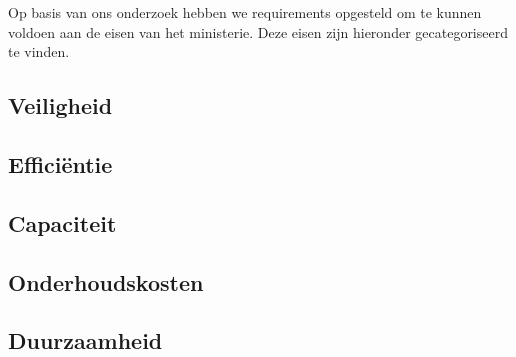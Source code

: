 \documentclass[../verslag.tex]{subfiles}
\begin{document}
Op basis van ons onderzoek hebben we requirements opgesteld om te kunnen voldoen aan de eisen van het ministerie. Deze eisen zijn hieronder gecategoriseerd te vinden.

\subsection{Veiligheid}

\subsection{Efficiëntie}

\subsection{Capaciteit}

\subsection{Onderhoudskosten}

\subsection{Duurzaamheid}
\end{document}
